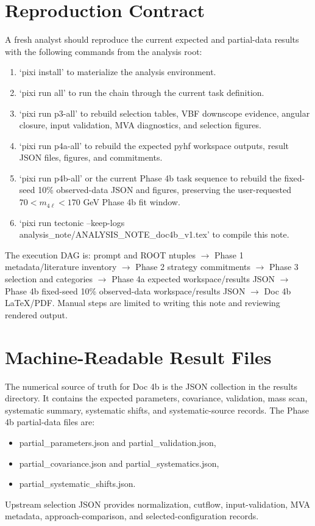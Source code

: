 \documentclass[11pt]{article}
\begin{document}
\section{Reproduction Contract}
A fresh analyst should reproduce the current expected and partial-data results with the following commands from the analysis root:
\begin{enumerate}[leftmargin=*]
\item `pixi install' to materialize the analysis environment.
\item `pixi run all' to run the chain through the current task definition.
\item `pixi run p3-all' to rebuild selection tables, VBF downscope evidence, angular closure, input validation, MVA diagnostics, and selection figures.
\item `pixi run p4a-all' to rebuild the expected pyhf workspace outputs, result JSON files, figures, and commitments.
\item `pixi run p4b-all' or the current Phase 4b task sequence to rebuild the fixed-seed 10\% observed-data JSON and figures, preserving the user-requested $70 < m_{4\ell} < 170$ GeV Phase 4b fit window.
\item `pixi run tectonic --keep-logs analysis\_note/ANALYSIS\_NOTE\_doc4b\_v1.tex' to compile this note.
\end{enumerate}
The execution DAG is: prompt and ROOT ntuples $\rightarrow$ Phase 1 metadata/literature inventory $\rightarrow$ Phase 2 strategy commitments $\rightarrow$ Phase 3 selection and categories $\rightarrow$ Phase 4a expected workspace/results JSON $\rightarrow$ Phase 4b fixed-seed 10\% observed-data workspace/results JSON $\rightarrow$ Doc 4b LaTeX/PDF. Manual steps are limited to writing this note and reviewing rendered output.
\section{Machine-Readable Result Files}
The numerical source of truth for Doc 4b is the JSON collection in the results directory. It contains the expected parameters, covariance, validation, mass scan, systematic summary, systematic shifts, and systematic-source records. The Phase 4b partial-data files are:
\begin{itemize}[leftmargin=*]
\item partial\_parameters.json and partial\_validation.json,
\item partial\_covariance.json and partial\_systematics.json,
\item partial\_systematic\_shifts.json.
\end{itemize}
Upstream selection JSON provides normalization, cutflow, input-validation, MVA metadata, approach-comparison, and selected-configuration records.
\clearpage


\end{document}
